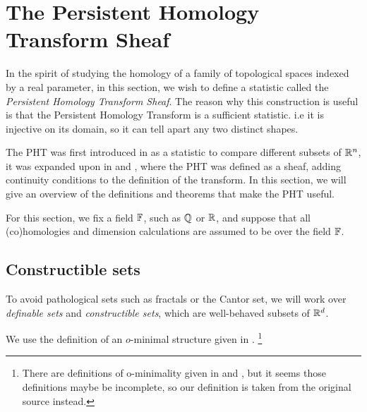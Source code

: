 \section{The Persistent Homology Transform Sheaf}

In the spirit of studying the homology of a family of topological spaces indexed by a real parameter, in this section, we wish to define a statistic called the \textit{Persistent Homology Transform Sheaf}. The reason why this construction is useful is that the Persistent Homology Transform is a sufficient statistic. i.e it is injective on its domain, so it can tell apart any two distinct shapes. 

The PHT was first introduced in \cite{Turner2014PHT} as a statistic to compare different subsets of \(\mathbb{R}^n\), it was expanded upon in \cite{Curry2018Directions} and \cite{Arya2022ShapeSpace}, where the PHT was defined as a sheaf, adding continuity conditions to the definition of the transform. In this section, we will give an overview of the definitions and theorems that make the PHT useful. 

For this section, we fix a field \(\mathbb{F}\), such as \(\mathbb{Q}\) or \(\mathbb{R}\), and suppose that all (co)homologies and dimension calculations are assumed to be over the field \(\mathbb{F}\).

\subsection{Constructible sets}

To avoid pathological sets such as fractals or the Cantor set, we will work over \textit{definable sets} and \textit{constructible sets}, which are well-behaved subsets of \(\mathbb{R}^d\). 

We use the definition of an \(o\)-minimal structure given in \cite{dries1998}.
\footnote{There are definitions of o-minimality given in  \cite{Arya2022ShapeSpace} and \cite{Curry2018Directions}, but it seems those definitions maybe be incomplete, so our definition is taken from the original source \cite{dries1998} instead.}

